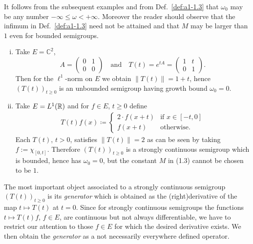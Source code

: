 It follows from the subsequent examples and from Def.~\ref{def:a1-1.3} that $\omega_{0}$ may be any number $ -\infty \leq \omega < +\infty$.
Moreover the reader should observe that the infimum in Def.~\ref{def:a1-1.3} need not be attained and that $M$ may be larger than $1$ even for bounded semigroups.
\begin{examples}\label{ex:a1-1.4}
\begin{enumerate}[(i), wide, labelsep=1em, itemindent=\parindent]

\item 
Take $E = \mathbb{C}^2$, 
\[
	A = \begin{pmatrix}0 & 1\\0 & 0\end{pmatrix} 
	\quad \text{and} \quad 
	T(t) = e^{tA} = \begin{pmatrix}1 & t\\0 & 1\end{pmatrix} .
\]
%
Then for the $\ell^{1}$-norm on $E$ we obtain $\|T(t)\| = 1 + t$, hence $(T(t))_{t\geq0}$ is an unbounded semigroup having growth bound $\omega_{0} = 0$.

\item 
Take $E = L^1(\mathbb{R})$ and for $f \in E$, $t \geq 0$ define
\begin{align*}
T(t)f(x) \coloneqq 
	\begin{cases}
		2\cdot f(x+t) & \text{if } x \in [-t,0] \\
		f(x+t) & \text{otherwise}.
	\end{cases}
\end{align*}
Each $T(t)$, $t > 0$, satisfies $\|T(t)\| = 2$ as can be seen by taking $f := \chi_{[0,t]}$.
Therefore $(T(t))_{t \geq 0}$ is a strongly continuous semigroup which is bounded, hence has $\omega_{0} = 0$, but the constant $M$ in (1.3) cannot be chosen to be $1$.

\end{enumerate}
\end{examples}
The most important object associated to a strongly continuous semigroup $(T(t))_{t\geq0}$ is its \emph{generator} which is obtained as the (right)derivative of the map $t \mapsto T(t)$ at $t = 0$.
Since for strongly continuous semigroups the functions $t \mapsto T(t)f$, $f \in E$, are continuous but not always differentiable, we have to restrict our attention to those $f \in E$ for which the desired derivative exists.
We then obtain the \emph{generator} as a not necessarily everywhere defined operator.

